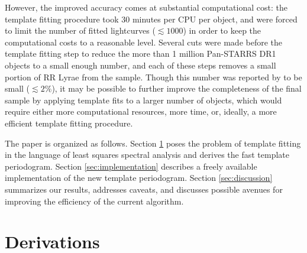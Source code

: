 \documentclass[apj]{emulateapj}
\newcommand{\todo}[1]{{\bf #1}}
\begin{document}
However, the improved accuracy comes at substantial computational cost: the template fitting 
procedure took 30 minutes per CPU per object, and \cite{Sesar_etal_2016} were forced to limit
the number of fitted lightcurves ($\lesssim 1000$) in order to keep the computational costs
to a reasonable level. Several cuts were made before the template fitting step to reduce the
more than 1 million Pan-STARRS DR1 objects to a small enough number, and each of these steps
removes a small portion of RR Lyrae from the sample. Though this number was reported by
\cite{Sesar_etal_2016} to be small ($\lesssim 2\%$), it may be possible to further improve
the completeness of the final sample by applying template fits to a larger number of objects,
which would require either more computational resources, more time, or, ideally, a more efficient
template fitting procedure.

The paper is organized as follows. Section \ref{sec:derivations} poses the problem of template
fitting in the language of least squares spectral analysis and derives the fast template
periodogram. Section \ref{sec:implementation} describes a freely available implementation 
of the new template periodogram. Section \ref{sec:discussion} summarizes our results, 
addresses caveats, and discusses possible avenues for improving the efficiency of the current 
algorithm.





\section{Derivations}\label{sec:derivations}
\end{document}
